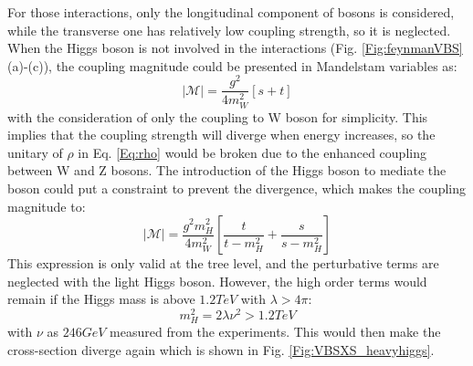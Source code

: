 \noindent
For those interactions, only the longitudinal component of bosons is considered, while the transverse one has relatively low coupling strength, so it is neglected. When the Higgs boson is not involved in the interactions (Fig. \ref{Fig:feynmanVBS} (a)-(c)), the coupling magnitude could be presented in Mandelstam variables as:
\begin{equation}
|\mathcal{M}|=\frac{g^2}{4m_{W}^{2}}\left[s+t\right]
\end{equation}
with the consideration of only the coupling to W boson for simplicity. This implies that the coupling strength will diverge when energy increases, so the unitary of $\rho$ in Eq. \ref{Eq:rho} would be broken due to the enhanced coupling between W and Z bosons. The introduction of the Higgs boson to mediate the boson could put a constraint to prevent the divergence, which makes the coupling magnitude to:
\begin{equation}
|\mathcal{M}|=\frac{g^2m_{H}^2}{4m_{W}^{2}}\left[\frac{t}{t-m_{H}^{2}}+\frac{s}{s-m_{H}^{2}}\right]
\end{equation} 
This expression is only valid at the tree level, and the perturbative terms are neglected with the light Higgs boson. However, the high order terms would remain if the Higgs mass is above $1.2TeV$ with $\lambda > 4\pi$:
\begin{equation}
m^2_{H}=2\lambda\nu^2 > 1.2TeV
\end{equation}
with $\nu$ as $246GeV$ measured from the experiments. This would then make the cross-section diverge again which is shown in Fig. \ref{Fig:VBSXS_heavyhiggs}. 

